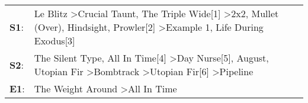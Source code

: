 \begin{supertabular}{p{0.03\textwidth}p{0.92\textwidth}}
 \textbf{S1}:  &  Le Blitz\textsuperscript{} \textgreater \enspace Crucial Taunt\textsuperscript{}, \enspace The Triple Wide[1]\textsuperscript{} \textgreater \enspace 2x2\textsuperscript{}, \enspace Mullet (Over)\textsuperscript{}, \enspace Hindsight\textsuperscript{}, \enspace Prowler[2]\textsuperscript{} \textgreater \enspace Example 1\textsuperscript{}, \enspace Life During Exodus[3]\textsuperscript{}  \enspace  \\
 \textbf{S2}:  &                                  The Silent Type\textsuperscript{}, \enspace All In Time[4]\textsuperscript{} \textgreater \enspace Day Nurse[5]\textsuperscript{}, \enspace August\textsuperscript{}, \enspace Utopian Fir\textsuperscript{} \textgreater \enspace Bombtrack\textsuperscript{} \textgreater \enspace Utopian Fir[6]\textsuperscript{} \textgreater \enspace Pipeline\textsuperscript{}  \enspace  \\
 \textbf{E1}:  &                                                                                                                                                                                                                                                                                                                 The Weight Around\textsuperscript{} \textgreater \enspace All In Time\textsuperscript{}  \enspace  \\
\end{supertabular}
